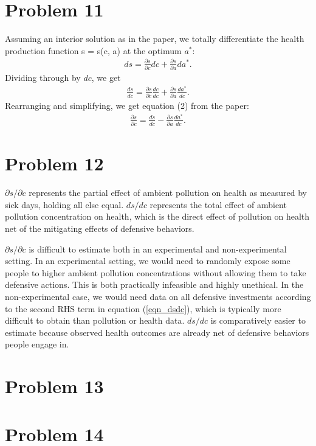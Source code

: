 \documentclass[12pt]{article}
\begin{document}
\section*{Problem 11}
Assuming an interior solution as in the paper, we totally differentiate the health production function s = s(c, a) at the optimum $a^*$:
\begin{align}
	ds = \frac{\partial s}{\partial c} dc + \frac{\partial s}{\partial a} da^*.
\end{align}
Dividing through by $dc$, we get
\begin{align}
	\frac{ds}{dc} = \frac{\partial s}{\partial c} \frac{dc}{dc} + \frac{\partial s}{\partial a} \frac{da^*}{dc}.
\end{align}
Rearranging and simplifying, we get equation (2) from the paper:
\begin{align} \label{eqn_dsdc}
	\frac{\partial s}{\partial c} = \frac{ds}{dc} - \frac{\partial s}{\partial a} \frac{da^*}{dc}.
\end{align}

\section*{Problem 12}
$\partial s/\partial c$ represents the partial effect of ambient pollution on health as measured by sick days, holding all else equal. $d s/ dc$ represents the total effect of ambient pollution concentration on health, which is the direct effect of pollution on health net of the mitigating effects of defensive behaviors.

 $\partial s / \partial c$ is difficult to estimate both in an experimental and non-experimental setting. In an experimental setting, we would need to randomly expose some people to higher ambient pollution concentrations without allowing them to take defensive actions. This is both practically infeasible and highly unethical. In the non-experimental case, we would need data on all defensive investments according to the second RHS term in equation (\ref{eqn_dsdc}), which is typically more difficult to obtain than pollution or health data. $ds / dc$ is comparatively easier to estimate because observed health outcomes are already net of defensive behaviors people engage in.


\section*{Problem 13}


\section*{Problem 14}
\end{document}
